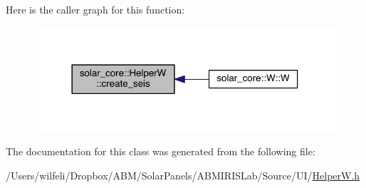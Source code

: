 Here is the caller graph for this function\+:\nopagebreak
\begin{figure}[H]
\begin{center}
\leavevmode
\includegraphics[width=318pt]{classsolar__core_1_1_helper_w_a2d53e9a0f5945ced5ddc0388278d2336_icgraph}
\end{center}
\end{figure}




The documentation for this class was generated from the following file\+:\begin{DoxyCompactItemize}
\item 
/\+Users/wilfeli/\+Dropbox/\+A\+B\+M/\+Solar\+Panels/\+A\+B\+M\+I\+R\+I\+S\+Lab/\+Source/\+U\+I/\hyperlink{_helper_w_8h}{Helper\+W.\+h}\end{DoxyCompactItemize}

